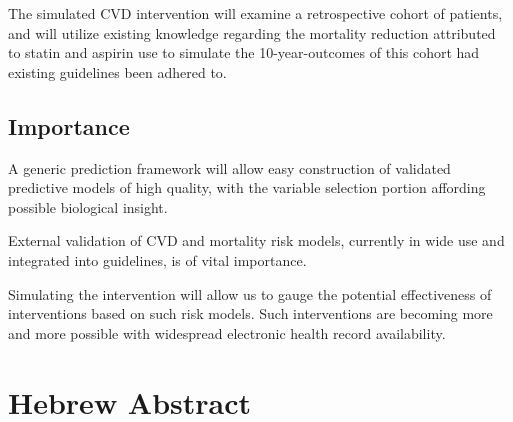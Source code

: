 \documentclass[a4paper,12pt]{article}
\begin{document}
		The simulated CVD intervention will examine a retrospective cohort of patients, and will utilize existing knowledge regarding the mortality reduction attributed to statin and aspirin use to simulate the 10-year-outcomes of this cohort had existing guidelines been adhered to.

		\subsection{Importance}
		A generic prediction framework will allow easy construction of validated predictive models of high quality, with the variable selection portion affording possible biological insight.
				
		External validation of CVD and mortality risk models, currently in wide use and integrated into guidelines, is of vital importance\cite{Moons2012}.
		
		Simulating  the intervention will allow us to gauge the potential effectiveness of interventions based on such risk models. Such interventions are becoming more and more possible with widespread electronic health record availability.
	
	
	\section{Hebrew Abstract}
	
\end{document}
